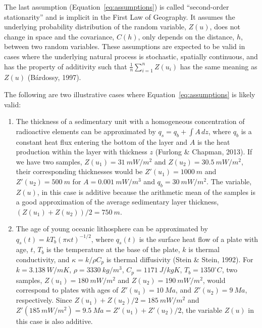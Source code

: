 \documentclass[draft,linenumbers]{agujournal2018}
\begin{document}
The last assumption (Equation~\ref{eq:assumptions}) is called
``second-order stationarity'' and is implicit in the First Law of
Geography. It assumes the underlying probability distribution of the
random variable, \(Z(u)\), does not change in space and the covariance,
\(C(h)\), only depends on the distance, \(h\), between two random
variables. These assumptions are expected to be valid in cases where the
underlying natural process is stochastic, spatially continuous, and has
the property of additivity such that \(\frac{1}{n}\sum_{i=1}^n Z(u_i)\)
has the same meaning as \(Z(u)\) (Bárdossy, 1997).

The following are two illustrative cases where
Equation~\ref{eq:assumptions} is likely valid:

\begin{enumerate}
\def\labelenumi{\arabic{enumi}.}
\item
  The thickness of a sedimentary unit with a homogeneous concentration
  of radioactive elements can be approximated by
  \(q_s = q_b + \int A \,dz\), where \(q_b\) is a constant heat flux
  entering the bottom of the layer and \(A\) is the heat production
  within the layer with thickness \(z\) (Furlong \& Chapman, 2013). If
  we have two samples, \(Z(u_1) = 31~mW/m^2\) and
  \(Z(u_2) = 30.5~mW/m^2\), their corresponding thicknesses would be
  \(Z'(u_1) = 1000~m\) and \(Z'(u_2) = 500~m\) for \(A = 0.001~mW/m^3\)
  and \(q_b = 30~mW/m^2\). The variable, \(Z(u)\), in this case is
  additive because the arithmetic mean of the samples is a good
  approximation of the average sedimentary layer thickness,
  \((Z(u_1) + Z(u_2)) / 2 = 750~m\).
\item
  The age of young oceanic lithosphere can be approximated by
  \(q_s(t) = kT_b(\pi\kappa t)^{-1/2}\), where \(q_s(t)\) is the surface
  heat flow of a plate with age, \(t\), \(T_b\) is the temperature at
  the base of the plate, \(k\) is thermal conductivity, and
  \(\kappa = k/\rho C_p\) is thermal diffusivity (Stein \& Stein, 1992).
  For \(k = 3.138~W/mK\), \(\rho = 3330~kg/m^3\), \(C_p = 1171~J/kgK\),
  \(T_b = 1350^{\circ}C\), two samples, \(Z(u_1) = 180~mW/m^2\) and
  \(Z(u_2) = 190~mW/m^2\), would correspond to plates with ages of
  \(Z'(u_1) = 10~Ma\), and \(Z'(u_2) = 9~Ma\), respectively. Since
  \(Z(u_1) + Z(u_2) / 2 = 185~mW/m^2\) and
  \(Z'(185~mW/m^2) = 9.5~Ma = Z'(u_1) + Z'(u_2) / 2\), the variable
  \(Z(u)\) in this case is also additive.
\end{enumerate}
\end{document}
